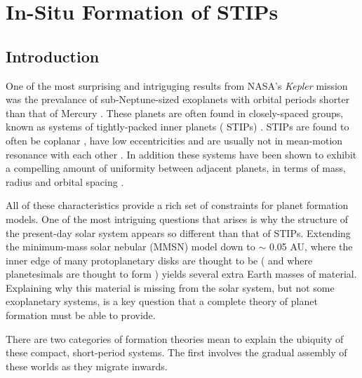 \chapter {In-Situ Formation of STIPs}


\section{Introduction} \label{sec:intro}

One of the most surprising and intriguging results from NASA's \textit{Kepler} mission was the prevalance 
of sub-Neptune-sized exoplanets with orbital periods shorter than that of Mercury \cite{borucki10}. These 
planets are often found in closely-spaced groups, known as systems of tightly-packed inner planets (
STIPs) \cite{latham11, lissauer11, lissauer14}. STIPs are found to often be coplanar 
\cite{fang12, tremaine12}, have low eccentricities \cite{vaneylen15, hadden17} and are usually not in 
mean-motion resonance with each other \cite{fabrycky14, steffen15}. In addition these systems have been 
shown to exhibit a compelling amount of uniformity between adjacent planets, in terms of mass, radius and 
orbital spacing \cite{millholland17, millholland21}.

All of these characteristics provide a rich set of constraints for planet formation models. One of the 
most intriguing questions that arises is why the structure of the present-day solar system appears so 
different than that of STIPs. Extending the minimum-mass solar nebular (MMSN) model \cite{hayashi81} down 
to $\sim$ 0.05 AU, where the inner edge of many protoplanetary disks are thought to be \cite{meyer97} (
and where planetesimals are thought to form \cite{mulders18}) yields several extra Earth masses of 
material. Explaining why this material is missing from the solar system, but not some exoplanetary 
systems, is a key question that a complete theory of planet formation must be able to provide.

There are two categories of formation theories mean to explain the ubiquity of these compact, short-period systems. The first involves the gradual assembly of these worlds as they migrate inwards.


